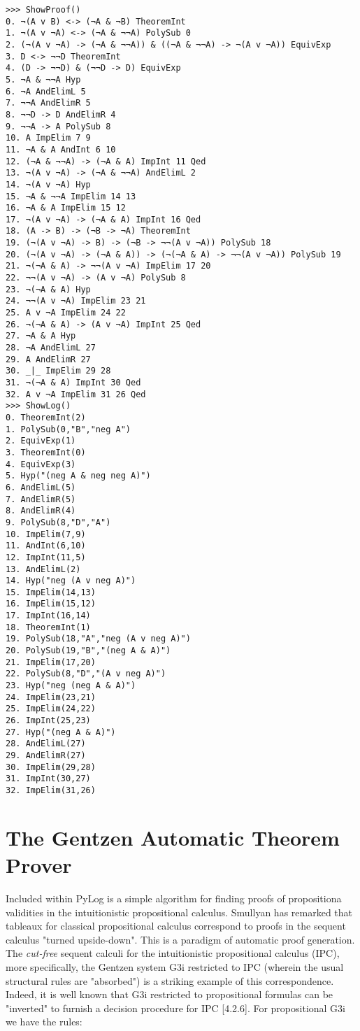 \documentclass[12pt,leqno]{article}
\numberwithin{equation}{section}
\begin{document}
\begin{verbatim}
>>> ShowProof()
0. ¬(A v B) <-> (¬A & ¬B) TheoremInt 
1. ¬(A v ¬A) <-> (¬A & ¬¬A) PolySub 0
2. (¬(A v ¬A) -> (¬A & ¬¬A)) & ((¬A & ¬¬A) -> ¬(A v ¬A)) EquivExp 
3. D <-> ¬¬D TheoremInt 
4. (D -> ¬¬D) & (¬¬D -> D) EquivExp 
5. ¬A & ¬¬A Hyp 
6. ¬A AndElimL 5
7. ¬¬A AndElimR 5
8. ¬¬D -> D AndElimR 4
9. ¬¬A -> A PolySub 8
10. A ImpElim 7 9
11. ¬A & A AndInt 6 10
12. (¬A & ¬¬A) -> (¬A & A) ImpInt 11 Qed
13. ¬(A v ¬A) -> (¬A & ¬¬A) AndElimL 2
14. ¬(A v ¬A) Hyp 
15. ¬A & ¬¬A ImpElim 14 13
16. ¬A & A ImpElim 15 12
17. ¬(A v ¬A) -> (¬A & A) ImpInt 16 Qed
18. (A -> B) -> (¬B -> ¬A) TheoremInt 
19. (¬(A v ¬A) -> B) -> (¬B -> ¬¬(A v ¬A)) PolySub 18
20. (¬(A v ¬A) -> (¬A & A)) -> (¬(¬A & A) -> ¬¬(A v ¬A)) PolySub 19
21. ¬(¬A & A) -> ¬¬(A v ¬A) ImpElim 17 20
22. ¬¬(A v ¬A) -> (A v ¬A) PolySub 8
23. ¬(¬A & A) Hyp 
24. ¬¬(A v ¬A) ImpElim 23 21
25. A v ¬A ImpElim 24 22
26. ¬(¬A & A) -> (A v ¬A) ImpInt 25 Qed
27. ¬A & A Hyp 
28. ¬A AndElimL 27
29. A AndElimR 27
30. _|_ ImpElim 29 28
31. ¬(¬A & A) ImpInt 30 Qed
32. A v ¬A ImpElim 31 26 Qed
>>> ShowLog()
0. TheoremInt(2)
1. PolySub(0,"B","neg A")
2. EquivExp(1)
3. TheoremInt(0)
4. EquivExp(3)
5. Hyp("(neg A & neg neg A)")
6. AndElimL(5)
7. AndElimR(5)
8. AndElimR(4)
9. PolySub(8,"D","A")
10. ImpElim(7,9)
11. AndInt(6,10)
12. ImpInt(11,5)
13. AndElimL(2)
14. Hyp("neg (A v neg A)")
15. ImpElim(14,13)
16. ImpElim(15,12)
17. ImpInt(16,14)
18. TheoremInt(1)
19. PolySub(18,"A","neg (A v neg A)")
20. PolySub(19,"B","(neg A & A)")
21. ImpElim(17,20)
22. PolySub(8,"D","(A v neg A)")
23. Hyp("neg (neg A & A)")
24. ImpElim(23,21)
25. ImpElim(24,22)
26. ImpInt(25,23)
27. Hyp("(neg A & A)")
28. AndElimL(27)
29. AndElimR(27)
30. ImpElim(29,28)
31. ImpInt(30,27)
32. ImpElim(31,26)
\end{verbatim}



\section*{The Gentzen Automatic Theorem Prover}

Included within PyLog is a simple algorithm for finding proofs of propositiona validities in the intuitionistic propositional calculus. Smullyan \cite{smu} has remarked that tableaux for classical propositional calculus correspond to proofs in the sequent calculus "turned upside-down".
This is a paradigm of automatic proof generation.
The \emph{cut-free} sequent calculi for the intuitionistic propositional calculus (IPC), more specifically, the Gentzen system G3i
restricted to IPC (wherein the usual structural rules are "absorbed") is a striking example of this correspondence. 
Indeed, it is well known that G3i restricted to propositional formulas can be "inverted" to furnish a 
decision procedure for IPC \cite{tro}[4.2.6].
For propositional G3i we have the rules:
\end{document}

